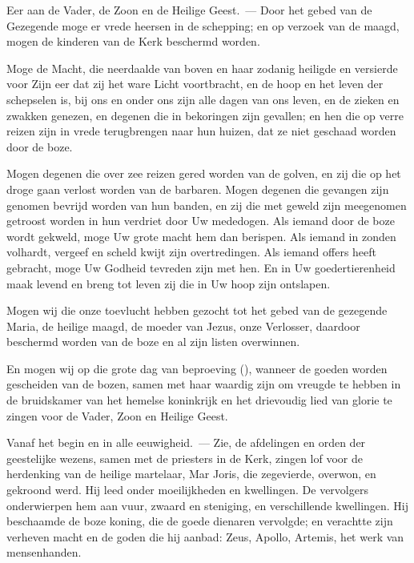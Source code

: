 \documentclass[12pt,twoside,a5paper]{article}
\begin{document}
\begin{halfparskip}

  Eer aan de Vader, de Zoon en de Heilige Geest.~--- Door het gebed van de Gezegende moge er vrede heersen in de schepping; en op verzoek van de maagd, mogen de kinderen van de Kerk beschermd worden.

  Moge de Macht, die neerdaalde van boven en haar zodanig heiligde en versierde voor Zijn eer dat zij het ware Licht voortbracht, en de hoop en het leven der schepselen is, bij ons en onder ons zijn alle dagen van ons leven, en de zieken en zwakken genezen, en degenen die in bekoringen zijn gevallen; en hen die op verre reizen zijn in vrede terugbrengen naar hun huizen, dat ze niet geschaad worden door de boze.

  Mogen degenen die over zee reizen gered worden van de golven, en zij die op het droge gaan verlost worden van de barbaren. Mogen degenen die gevangen zijn genomen bevrijd worden van hun banden, en zij die met geweld zijn meegenomen getroost worden in hun verdriet door Uw mededogen. Als iemand door de boze wordt gekweld, moge Uw grote macht hem dan berispen. Als iemand in zonden volhardt, vergeef en scheld kwijt zijn overtredingen. Als iemand offers heeft gebracht, moge Uw Godheid tevreden zijn met hen. En in Uw goedertierenheid maak levend en breng tot leven zij die in Uw hoop zijn ontslapen.

  Mogen wij die onze toevlucht hebben gezocht tot het gebed van de gezegende Maria, de heilige maagd, de moeder van Jezus, onze Verlosser, daardoor beschermd worden van de boze en al zijn listen overwinnen.

  En mogen wij op die grote dag van beproeving (), wanneer de goeden worden gescheiden van de bozen, samen met haar waardig zijn om vreugde te hebben in de bruidskamer van het hemelse koninkrijk en het drievoudig lied van glorie te zingen voor de Vader, Zoon en Heilige Geest.

  Vanaf het begin en in alle eeuwigheid.~--- Zie, de afdelingen en orden der geestelijke wezens, samen met de priesters in de Kerk, zingen lof voor de herdenking van de heilige martelaar, Mar Joris, die zegevierde, overwon, en gekroond werd. Hij leed onder moeilijkheden en kwellingen. De vervolgers onderwierpen hem aan vuur, zwaard en steniging, en verschillende kwellingen. Hij beschaamde de boze koning, die de goede dienaren vervolgde; en verachtte zijn verheven macht en de goden die hij aanbad: Zeus, Apollo, Artemis, het werk van mensenhanden.


\end{halfparskip}
\end{document}
